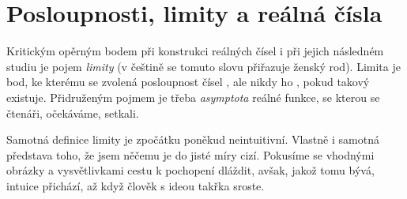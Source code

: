 \chapter{Posloupnosti, limity a reálná čísla}
\label{chap:posloupnosti-limity-a-realna-cisla}

Kritickým opěrným bodem při konstrukci reálných čísel i při jejich následném
studiu je pojem \emph{limity} (v češtině se tomuto slovu přiřazuje ženský rod).
Limita je bod, ke kterému se zvolená posloupnost čísel , ale nikdy ho
, pokud takový existuje. Přidruženým pojmem je třeba
\emph{asymptota} reálné funkce, se kterou se čtenáři, očekáváme, setkali.

Samotná definice limity je zpočátku poněkud neintuitivní. Vlastně i samotná
představa toho, že jsem něčemu  je do jisté míry cizí.
Pokusíme se vhodnými obrázky a vysvětlivkami cestu k pochopení dláždit, avšak,
jakož tomu bývá, intuice přichází, až když člověk s ideou takřka sroste.



